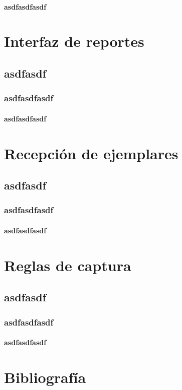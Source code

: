 \documentclass{book}
\begin{document}
            \paragraph{asdfasdfasdf}
\section{Interfaz de reportes}
    \subsection{asdfasdf}
        \subsubsection{asdfasdfasdf}
            \paragraph{asdfasdfasdf}
\section{Recepción de ejemplares}
    \subsection{asdfasdf}
        \subsubsection{asdfasdfasdf}
            \paragraph{asdfasdfasdf}
\section{Reglas de captura}
    \subsection{asdfasdf}
        \subsubsection{asdfasdfasdf}
            \paragraph{asdfasdfasdf}
\section{Bibliografía}
\end{document}

